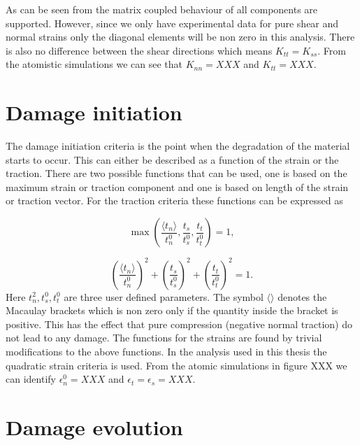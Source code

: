 \documentclass[generate_interface_elements.tex]{subfiles}
\begin{document}
As can be seen from the matrix coupled behaviour of all components are supported. However, since we only have experimental data for pure shear and normal strains only the diagonal elements will be non zero in this analysis. There is also no difference between the shear directions which means $K_{tt} = K_{ss}$. From the atomistic simulations we can see that $K_{nn} = XXX$ and $K_{tt} = XXX$.

 
 

\section{Damage initiation}

The damage initiation criteria is the point when the degradation of the material starts to occur. This can either be described as a function of the strain or the traction. There are two possible functions that can be used, one is based on the maximum strain or traction component and one is based on length of the strain or traction vector. For the traction criteria these functions can be expressed as

\[ \max \left( \frac{\langle t_n \rangle}{t_n^0} ,\frac{ t_s }{t_s^0} ,  \frac{ t_t }{t_t^0}  \right) = 1,  \] 

\[  \left( \frac{\langle t_n \rangle}{t_n^0} \right)^2 +   \left( \frac{ t_s }{t_s^0} \right)^2 +   \left( \frac{ t_t }{t_t^0} \right)^2 = 1.   \]	
%
Here $t_n^2, t_s^0, t_t^0$ are three user defined parameters. The symbol $\langle \rangle$ denotes the Macaulay brackets which is non zero only if the quantity inside the bracket is positive. This has the effect that pure compression (negative normal traction) do not lead to any damage. The functions for the strains are found by trivial modifications to the above functions. In the analysis used in this thesis the quadratic strain criteria is used. From the atomic simulations in figure XXX we can identify $\epsilon_n^0 = XXX$ and $\epsilon_t = \epsilon_s = XXX$.

\section{Damage evolution}
\end{document}

